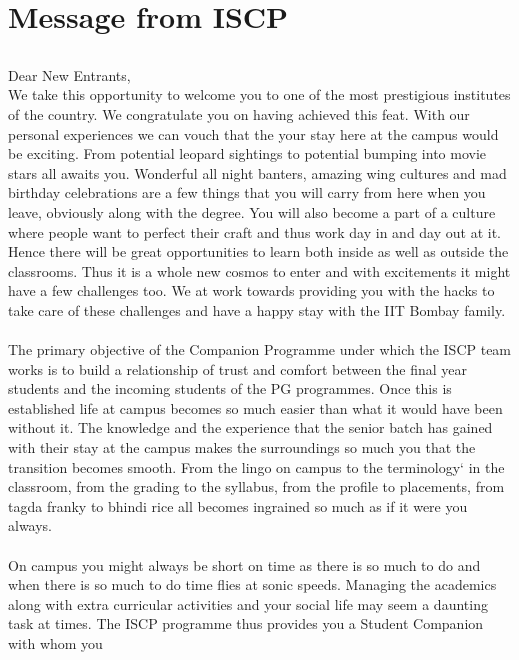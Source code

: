 \documentclass[openany]{book} %
\begin{document}
\chapter{Message from ISCP}

\section*{}

Dear New Entrants,\\
We take this opportunity to welcome you to one of the most prestigious institutes of the country. We
congratulate you on having achieved this feat. With our personal experiences we can vouch that the your stay here at the campus would be exciting. From potential leopard sightings to potential bumping into movie stars all awaits you. Wonderful all night banters, amazing wing cultures and mad birthday celebrations are a few things that you will carry from here when you leave, obviously along with the degree. You will also become a part of a culture where people want to perfect their craft and thus work day in and day out at it. Hence there will be great opportunities to learn both inside as well as outside the classrooms. Thus it is a whole new cosmos to enter and with excitements it might have a few challenges too. We at \href{https://gymkhana.iitb.ac.in/~scp/scp/index.html}{\color{blue}{Institute Students Companion Program (ISCP)}}  work towards providing you with the hacks to take care of these challenges and have a happy stay with the IIT Bombay family.\\
\\
The primary objective of the Companion Programme under which the ISCP team works is to build a
relationship of trust and comfort between the final year students and the incoming students of the PG
programmes. Once this is established life at campus becomes so much easier than what it would have been
without it. The knowledge and the experience that the senior batch has gained with their stay at the campus makes the surroundings so much you that the transition becomes smooth. From the lingo on campus to the terminology` in the classroom, from the grading to the syllabus, from the profile to placements, from tagda franky to bhindi rice all becomes ingrained so much as if it were you always.\\ 
\\
On campus you might always be short on time as there is so much to do and when there is so much to do time
flies at sonic speeds. Managing the academics along with extra curricular activities and your social life may seem a daunting task at times. The ISCP programme thus provides you a Student Companion with whom you
\end{document}
